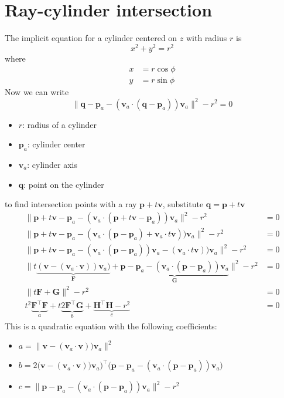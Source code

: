 \documentclass[a4paper, 12pt]{article}
\begin{document}
\section{Ray-cylinder intersection}
The implicit equation for a cylinder centered on $z$ with radius $r$ is
$$
x^2 + y^2 = r^2
$$
where
\begin{align*}
  x&=r\cos\phi\\
  y&=r\sin\phi
\end{align*}
Now we can write
$$
\|\textbf{q} - \textbf{p}_a - (\textbf{v}_a \cdot (\textbf{q} - \textbf{p}_a))\textbf{v}_a\|^2 - r^2 = 0
$$
\begin{itemize}
  \item $r$: radius of a cylinder 
  \item $\textbf{p}_a$: cylinder center
  \item $\textbf{v}_a$: cylinder axis
  \item $\textbf{q}$: point on the cylinder
\end{itemize}
to find intersection points with a ray $\textbf{p} + t\textbf{v}$, substitute $\textbf{q} = \textbf{p} + t\textbf{v}$ 
\begin{align*}
\|\textbf{p} + t\textbf{v} - \textbf{p}_a - (\textbf{v}_a \cdot (\textbf{p} + t\textbf{v} - \textbf{p}_a))\textbf{v}_a\|^2 - r^2 &= 0\\
\|\textbf{p} + t\textbf{v} - \textbf{p}_a - (\textbf{v}_a \cdot (\textbf{p}  -\textbf{p}_a) + \textbf{v}_a\cdot t\textbf{v} ))\textbf{v}_a\|^2 - r^2 &= 0\\
\|\textbf{p} + t\textbf{v} - \textbf{p}_a - (\textbf{v}_a \cdot (\textbf{p}  -\textbf{p}_a))\textbf{v}_a - (\textbf{v}_a\cdot t\textbf{v} ))\textbf{v}_a\|^2 - r^2 &= 0\\
\|t\underbrace{(\textbf{v} - (\textbf{v}_a\cdot \textbf{v} ))\textbf{v}_a)}_{\textbf{F}} + \underbrace{\textbf{p}  - \textbf{p}_a - (\textbf{v}_a \cdot (\textbf{p}  -\textbf{p}_a))\textbf{v}_a}_{\textbf{G}} \|^2 - r^2 &= 0\\
\|t\textbf{F} +\textbf{G} \|^2 - r^2 &= 0\\
t^2\underbrace{\textbf{F}^\top\textbf{F}}_{a} +t\underbrace{2\textbf{F}^\top\textbf{G}}_{b} + \underbrace{\textbf{H}^\top\textbf{H}  - r^2}_{c} &= 0
\end{align*}
This is a quadratic equation with the following coefficients:
\begin{itemize}
  \item $a = \|\textbf{v} - (\textbf{v}_a\cdot \textbf{v} ))\textbf{v}_a\|^2$
\item $b = 2\Big(\textbf{v} - (\textbf{v}_a\cdot \textbf{v} ))\textbf{v}_a\Big)^\top \Big(\textbf{p}  - \textbf{p}_a - (\textbf{v}_a \cdot (\textbf{p}  -\textbf{p}_a))\textbf{v}_a\Big)$
\item  $ c = \|\textbf{p}  - \textbf{p}_a - (\textbf{v}_a \cdot (\textbf{p}  -\textbf{p}_a))\textbf{v}_a\|^2 - r^2$
\end{itemize}
\end{document}
